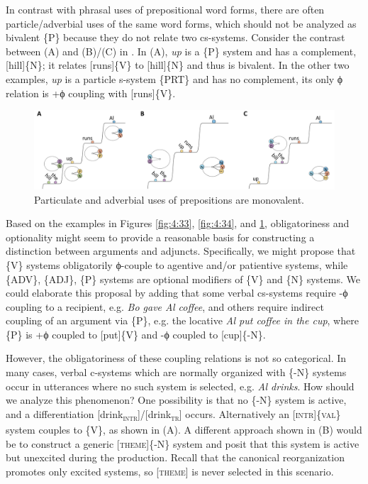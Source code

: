   In contrast with phrasal uses of prepositional word forms, there are often particle/adverbial uses of the same word forms, which should not be analyzed as bivalent \{P\} because they do not relate two cs-systems. Consider the contrast between (A) and (B)/(C) in {}. In (A), \textit{up} is a \{P\} system and has a complement, [hill]\{N\}; it relates [runs]\{V\} to [hill]\{N\} and thus is bivalent. In the other two examples, \textit{up} is a particle s-system \{PRT\} and has no complement, its only ϕ relation is +ϕ coupling with [runs]\{V\}.

  
\begin{figure}
\includegraphics[width=\textwidth]{figures/Tilsen-img85.png}
\caption{Particulate and adverbial uses of prepositions are monovalent.}
\label{fig:4:35}
\end{figure}
 

  Based on the examples in Figures {\ref{fig:4:33}}, {\ref{fig:4:34}}, and {\ref{fig:4:35}}, obligatoriness and optionality might seem to provide a reasonable basis for constructing a distinction between arguments and adjuncts. Specifically, we might propose that \{V\} systems obligatorily ϕ-couple to agentive and/or patientive systems, while \{ADV\}, \{ADJ\}, \{P\} systems are optional modifiers of \{V\} and \{N\} systems. We could elaborate this proposal by adding that some verbal cs-systems require -ϕ coupling to a recipient, e.g. \textit{Bo gave Al coffee}, and others require indirect coupling of an argument via \{P\}, e.g. the locative \textit{Al put coffee in the cup}, where \{P\} is +ϕ coupled to [put]\{V\} and -ϕ coupled to [cup]\{-N\}.

  However, the obligatoriness of these coupling relations is not so categorical. In many cases, verbal c-systems which are normally organized with \{-N\} systems occur in utterances where no such system is selected, e.g. \textit{Al drinks}. How should we analyze this phenomenon? One possibility is that no \{-N\} system is active, and a differentiation [drink\textsc{\textsubscript{intr}}]/[drink\textsc{\textsubscript{tr}}] occurs. Alternatively an [\textsc{intr}]\{\textsc{val}\} system couples to \{V\}, as shown in {}(A). A different approach shown in (B) would be to construct a generic [\textsc{theme}]\{-N\} system and posit that this system is active but unexcited during the production. Recall that the canonical reorganization promotes only excited systems, so [\textsc{theme}] is never selected in this scenario. 

